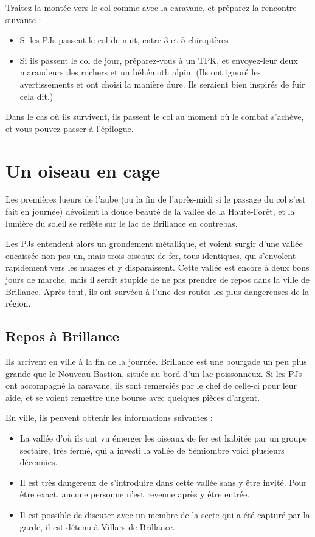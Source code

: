 \documentclass[10pt,twoside,twocolumn,openany,bg=print,justified]{dndbook}
\begin{document}
Traitez la montée vers le col comme avec la caravane, et préparez la rencontre suivante :

\begin{itemize}
	\item Si les PJs passent le col de nuit, entre 3 et 5 chiroptères
	\item Si ils passent le col de jour, préparez-vous à un TPK, et envoyez-leur deux maraudeurs des rochers et un béhémoth alpin. (Ils ont ignoré les avertissements et ont choisi la manière dure. Ils seraient bien inspirés de fuir cela dit.)
\end{itemize}

Dans le cas où ils survivent, ils passent le col au moment où le combat s'achève, et vous pouvez passer à l'épilogue.

\section{Un oiseau en cage}

Les premières lueurs de l'aube (ou la fin de l'après-midi si le passage du col s'est fait en journée) dévoilent la douce beauté de la vallée de la Haute-Forêt, et la lumière du soleil se reflète sur le lac de Brillance en contrebas. 

Les PJs entendent alors un grondement métallique, et voient surgir d'une vallée encaissée non pas un, mais trois oiseaux de fer, tous identiques, qui s'envolent rapidement vers les nuages et y disparaissent. Cette vallée est encore à deux bons jours de marche, mais il serait stupide de ne pas prendre de repos dans la ville de Brillance. Après tout, ils ont survécu à l'une des routes les plus dangereuses de la région.

\subsection*{Repos à Brillance}

Ils arrivent en ville à la fin de la journée. Brillance est une bourgade un peu plus grande que le Nouveau Bastion, située au bord d'un lac poissonneux. Si les PJs ont accompagné la caravane, ils sont remerciés par le chef de celle-ci pour leur aide, et se voient remettre une bourse avec quelques pièces d'argent.

En ville, ils peuvent obtenir les informations suivantes :

\begin{itemize}
	\item La vallée d'où ils ont vu émerger les oiseaux de fer est habitée par un groupe sectaire, très fermé, qui a investi la vallée de Sémiombre voici plusieurs décennies.
	\item Il est très dangereux de s'introduire dans cette vallée sans y être invité. Pour être exact, aucune personne n'est revenue après y être entrée.
	\item Il est possible de discuter avec un membre de la secte qui a été capturé par la garde, il est détenu à Villars-de-Brillance.
\end{itemize}
\end{document}

